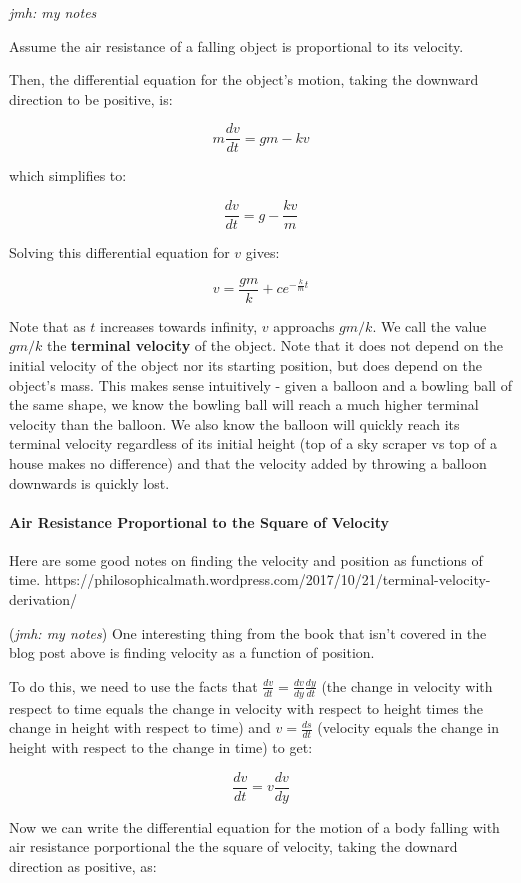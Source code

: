 \documentclass{article}
\begin{document}
\emph{jmh: my notes}

Assume the air resistance of a falling object is proportional to its velocity.

Then, the differential equation for the object's motion, taking the downward direction to be positive, is:

\[ m\frac{dv}{dt} = gm - kv \]

which simplifies to: 

\[ \frac{dv}{dt} = g - \frac{kv}{m} \]

Solving this differential equation for $v$ gives:

\[ v = \frac{gm}{k} + ce^{-\frac{k}{m}t} \]

Note that as $t$ increases towards infinity, $v$ approachs $gm/k$. We call the value $gm/k$ the \textbf{terminal velocity} of the object. Note that it does not depend on the initial velocity of the object nor its starting position, but does depend on the object's mass. This makes sense intuitively - given a balloon and a bowling ball of the same shape, we know the bowling ball will reach a much higher terminal velocity than the balloon. We also know the balloon will quickly reach its terminal velocity regardless of its initial height (top of a sky scraper vs top of a house makes no difference) and that the velocity added by throwing a balloon downwards is quickly lost.

\paragraph{Air Resistance Proportional to the Square of Velocity}

Here are some good notes on finding the velocity and position as functions of time. https://philosophicalmath.wordpress.com/2017/10/21/terminal-velocity-derivation/

(\emph{jmh: my notes}) One interesting thing from the book that isn't covered in the blog post above is finding velocity as a function of position.

To do this, we need to use the facts that $\frac{dv}{dt} = \frac{dv}{dy}\frac{dy}{dt}$ (the change in velocity with respect to time equals the change in velocity with respect to height times the change in height with respect to time) and $v = \frac{ds}{dt}$ (velocity equals the change in height with respect to the change in time) to get:

\[ \frac{dv}{dt} = v\frac{dv}{dy} \]

Now we can write the differential equation for the motion of a body falling with air resistance porportional the the square of velocity, taking the downard direction as positive, as:
\end{document}
